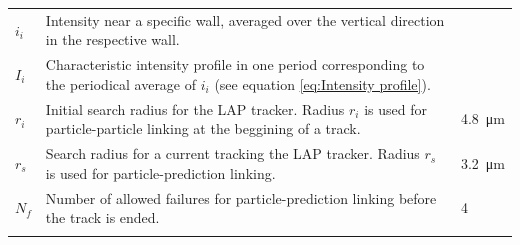 \begin{table}[!h]
\begin{tabularx}{\textwidth}{lXl}
         $i_{i}$ & Intensity near a specific wall, averaged over the vertical direction in the respective wall.  & \quad \\
         $I_{i}$ & Characteristic intensity profile in one period corresponding to the periodical average of $i_i$ (see equation \ref{eq:Intensity profile}).   & \quad \\
         $r_i$ & Initial search radius for the LAP tracker. Radius $r_i$ is used for particle-particle linking at the beggining of a track.   & \SI{4.8}{\micro \meter} \\
         $r_s$ & Search radius for a current tracking the LAP tracker. Radius $r_s$ is used for particle-prediction linking.    & \SI{3.2}{\micro \meter} \\
         $N_f$ & Number of allowed failures for particle-prediction linking before the track is ended. & 4 \\
    \hline\noalign{\smallskip}
    \end{tabularx}
    \label{table:image analysis parameters}
\end{table}
